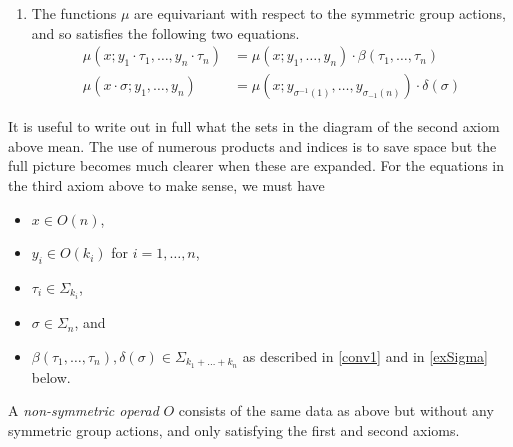 \begin{Defi}
\begin{enumerate}
\item The functions $\mu$ are equivariant with respect to the symmetric group actions, and so satisfies the following two equations.
  \begin{align*}
    \mu(x;y_1 \cdot \tau_1,\ldots,y_n \cdot \tau_n) &= \mu(x;y_1,\ldots,y_n)\cdot \beta(\tau_1,\ldots,\tau_n)\\
    \mu(x \cdot \sigma; y_1, \ldots, y_n) &= \mu\left(x;y_{\sigma^{-1}(1)},\ldots,y_{\sigma_{-1}(n)}\right)\cdot \delta(\sigma)
  \end{align*}
\end{enumerate}
\end{Defi}

\begin{rem}
It is useful to write out in full what the sets in the diagram of the second axiom above mean. The use of numerous products and indices is to save space but the full picture becomes much clearer when these are expanded. For the equations in the third axiom above to make sense, we must have
\begin{itemize}
\item $x \in O(n)$,
\item $y_{i} \in O(k_{i})$ for $i=1, \ldots, n$,
\item $\tau_{i} \in \Sigma_{k_{i}}$,
\item $\sigma \in \Sigma_{n}$, and
\item $\beta(\tau_1,\ldots,\tau_n), \delta(\sigma) \in \Sigma_{k_1 + \ldots + k_n}$ as described in \cref{conv1} and in \cref{exSigma} below.
\end{itemize}

\end{rem}
\begin{Defi}
A \emph{non-symmetric operad} $O$ consists of the same data as above but without any symmetric group actions, and only satisfying the first and second axioms.
\end{Defi}

